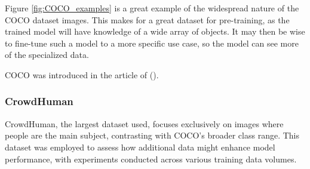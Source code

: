 Figure \ref{fig:COCO_examples} is a great example of the widespread nature of the COCO dataset images. This makes for a great dataset for pre-training, as the trained model will have knowledge of a wide array of objects. It may then be wise to fine-tune such a model to a more specific use case, so the model can see more of the specialized data. 

COCO was introduced in the article of \citeauthor{lin2015microsoft} (\citeyear{lin2015microsoft}).

\newpage
\subsubsection{CrowdHuman}
\label{sec:dataset_CrowdHuman}
CrowdHuman, the largest dataset used, focuses exclusively on images where people are the main subject, contrasting with COCO's broader class range. This dataset was employed to assess how additional data might enhance model performance, with experiments conducted across various training data volumes.

